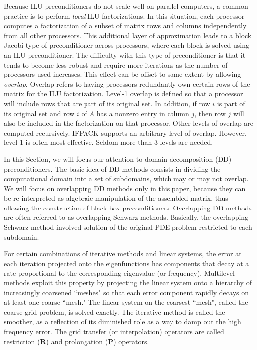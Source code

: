 \documentclass[10pt,relax]{SANDreport}
\begin{document}
Because ILU preconditioners do not scale well on parallel computers, a common
practice is to perform {\em local} ILU factorizations.  In this situation, each
processor computes a factorization of a subset of matrix rows and columns independently
from all other processors.  This additional layer of approximation leads to a block
Jacobi type of preconditioner across processors, where each block is solved using an
ILU preconditioner.  The difficulty with this type of preconditioner is that it
tends to become less robust and require more iterations as the number of processors used
increases.  This effect can be offset to some extent by allowing {\em overlap}.  Overlap
refers to having processors redundantly own certain rows of the matrix for the ILU
factorization.  Level-1 overlap is defined so that a processor will include rows that
are part of its original set.  In addition, if row $i$ is part of its original set and
row $i$ of $A$ has a nonzero entry in column $j$, then row $j$ will also
be included in the factorization on that processor.  Other levels of overlap are
computed recursively.  IFPACK supports an arbitrary level of overlap.  However,
level-1 is often most effective.  Seldom more than 3 levels are needed.



In this Section, we will focus
our attention to domain decomposition (DD) preconditioners. The basic idea of
DD methods consists in dividing the computational domain into a set of
subdomains, which may or may not overlap. We will focus on overlapping DD
methods only in this paper, because they can be re-interpreted as algebraic
manipulation of the assembled matrix, thus allowing the construction of
black-box preconditioners. Overlapping DD methods are often referred to as
overlapping Schwarz methods. Basically, the overlapping Schwarz method
involved solution of the original PDE problem restricted to each subdomain.



For certain combinations of iterative methods and linear systems, the
error at each iteration projected onto the eigenfunctions has components
that decay at a rate proportional to the corresponding eigenvalue (or
frequency).  Multilevel methods exploit this property \cite{Briggs2000}
by projecting the linear system onto a hierarchy of increasingly
coarsened ``meshes" so that each error component rapidly decays on at
least one coarse ``mesh."  The linear system on the coarsest ``mesh",
called the coarse grid problem, is solved exactly.  The iterative method
is called the smoother, as a reflection of its diminished role as a way
to damp out the high frequency error.  The grid transfer (or
interpolation) operators are called restriction ($\mathbf{R}$) and
prolongation ($\mathbf{P}$) operators.
\end{document}
